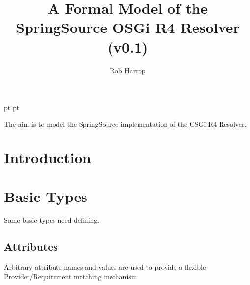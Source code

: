 \documentclass[a4paper,9pt]{article}
\begin{document}
 pt
 pt

\title{A Formal Model of the SpringSource OSGi R4 Resolver (v0.1)}
\author{Rob Harrop}
\maketitle
\thispagestyle{myheadings}
\setcounter{page}{0}

The aim is to model the SpringSource implementation of the OSGi R4 Resolver.


\newcommand{\true}{true}
\newcommand{\false}{false}
\renewcommand{\empty}{\emptyset}
\newcommand{\ModuleDefZero}{ModuleDef_0}
\newcommand{\ModuleDefOne}{ModuleDef_1}
\newcommand{\ModuleDefTwo}{ModuleDef_2}
\newcommand{\ModuleDefThree}{ModuleDef_3}
\newcommand{\ModuleDefFour}{ModuleDef_4}


\clearpage
{}
\section{Introduction}


\clearpage
\section{Basic Types}
\label{cha:basics}

Some basic types need defining.

\subsection*{Attributes}
Arbitrary attribute names and values are used to provide a flexible Provider/Requirement matching mechanism

\begin{zed}
\end{zed}
\end{document}
